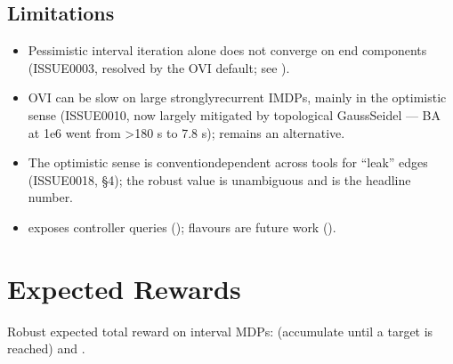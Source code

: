 \documentclass[a4paper,10pt,english]{sphinxmanual}
\begin{document}
\subsection{Limitations}
\label{\detokenize{manual/specifications:limitations}}\begin{itemize}
\item {} 
\sphinxAtStartPar
Pessimistic interval iteration alone does not converge on  end
components (ISSUE\sphinxhyphen{}0003, resolved by the OVI default; see {\hyperref[\detokenize{manual/engines::doc}]{}}).

\item {} 
\sphinxAtStartPar
OVI can be slow on large strongly\sphinxhyphen{}recurrent IMDPs, mainly in the optimistic sense
(ISSUE\sphinxhyphen{}0010, now largely mitigated by topological Gauss\textendash{}Seidel — BA at 1e\sphinxhyphen{}6 went from \textgreater{}180 s to 7.8 s);  remains an alternative.

\item {} 
\sphinxAtStartPar
The optimistic sense is convention\sphinxhyphen{}dependent across tools for \sphinxcode{\sphinxupquote{{[}0,hi{]}}} “leak” edges
(ISSUE\sphinxhyphen{}0018,  \S{}4); the robust value is unambiguous and is the
headline number.

\item {} 
\sphinxAtStartPar
{} exposes controller\sphinxhyphen{} queries ();  flavours are
future work ().

\end{itemize}

\sphinxstepscope


\section{Expected Rewards}
\label{\detokenize{manual/rewards:expected-rewards}}\label{\detokenize{manual/rewards::doc}}
\sphinxAtStartPar
Robust expected total reward on interval MDPs:  (accumulate
until a target is reached) and .
\end{document}
